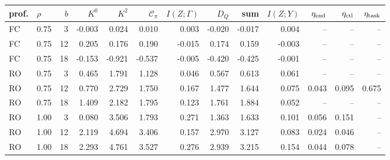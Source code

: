 \begin{tabular}{llr rrr rrr r rrr}
\toprule
prof. & $\rho$ & $b$ & $K^0$ & $K^2$ & $\mathcal C_\pi$ & $I(Z;\Gamma)$ & $D_Q$ & sum & $I(Z;Y)$ & $\eta_{\rm end}$ & $\eta_{\rm ctl}$ & $\eta_{\rm task}$ \\
\midrule
FC & 0.75 & 3 & -0.003 & 0.024 & 0.010 & 0.003 & -0.020 & -0.017 & 0.004 & -- & -- & -- \\
FC & 0.75 & 12 & 0.205 & 0.176 & 0.190 & -0.015 & 0.174 & 0.159 & -0.003 & -- & -- & -- \\
FC & 0.75 & 18 & -0.153 & -0.921 & -0.537 & -0.005 & -0.420 & -0.425 & -0.001 & -- & -- & -- \\
RO & 0.75 & 3 & 0.465 & 1.791 & 1.128 & 0.046 & 0.567 & 0.613 & 0.061 & -- & -- & -- \\
RO & 0.75 & 12 & 0.770 & 2.729 & 1.750 & 0.167 & 1.477 & 1.644 & 0.075 & 0.043 & 0.095 & 0.675 \\
RO & 0.75 & 18 & 1.409 & 2.182 & 1.795 & 0.123 & 1.761 & 1.884 & 0.052 & -- & -- & -- \\
RO & 1.00 & 3 & 0.080 & 3.506 & 1.793 & 0.271 & 1.363 & 1.633 & 0.101 & 0.056 & 0.151 & -- \\
RO & 1.00 & 12 & 2.119 & 4.694 & 3.406 & 0.157 & 2.970 & 3.127 & 0.083 & 0.024 & 0.046 & -- \\
RO & 1.00 & 18 & 2.293 & 4.761 & 3.527 & 0.276 & 2.939 & 3.215 & 0.154 & 0.044 & 0.078 & -- \\
\bottomrule
\end{tabular}